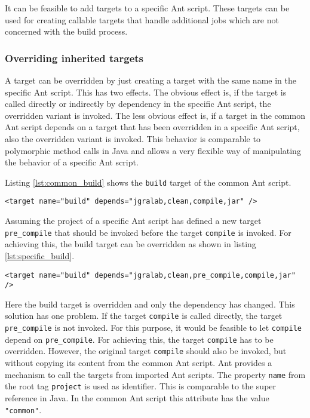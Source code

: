 \documentclass[a4paper,twoside,11pt,bibtotoc]{article}
\begin{document}

It can be feasible to add targets to a specific Ant script.
These targets can be used for creating callable targets that handle additional jobs which are not concerned with the build process.%

\subsubsection{Overriding inherited targets}
\label{sec:override}
A target can be overridden by just creating a target with the same name in the specific Ant script.
This has two effects.
The obvious effect is, if the target is called directly or indirectly by dependency in the specific Ant script, the overridden variant is invoked.
The less obvious effect is, if a target in the common Ant script depends on a target that has been overridden in a specific Ant script, also the overridden variant is invoked.
This behavior is comparable to polymorphic method calls in Java and allows a very flexible way of manipulating the behavior of a specific Ant script.

Listing \ref{lst:common_build} shows the \texttt{build} target of the common Ant script.
\begin{lstlisting}[caption=Target \texttt{build} in the common Ant script,label=lst:common_build,float=!ht,language=Ant]
	<target name="build" depends="jgralab,clean,compile,jar" />
\end{lstlisting}

Assuming the project of a specific Ant script has defined a new target \texttt{pre\_compile} that should be invoked before the target \texttt{compile} is invoked.
For achieving this, the build target can be overridden as shown in listing \ref{lst:specific_build}.

\begin{lstlisting}[caption=Target \texttt{build} in a specific Ant script,label=lst:specific_build,float=!ht,language=Ant]
	<target name="build" depends="jgralab,clean,pre_compile,compile,jar" />
\end{lstlisting}

Here the build target is overridden and only the dependency has changed.
This solution has one problem.
If the target \texttt{compile} is called directly, the target \texttt{pre\_compile} is not invoked.
For this purpose, it would be feasible to let \texttt{compile} depend on \texttt{pre\_compile}.
For achieving this, the target \texttt{compile} has to be overridden.
However, the original target \texttt{compile} should also be invoked, but without copying its content from the common Ant script.
Ant provides a mechanism to call the targets from imported Ant scripts.
The property \texttt{name} from the root tag \texttt{project} is used as identifier.
This is comparable to the super reference in Java.
In the common Ant script this attribute has the value \texttt{"common"}.
\end{document}
